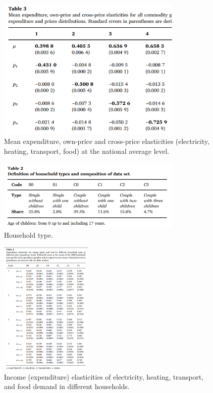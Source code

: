 \begin{figure}[h]  %
	\centering
	\includegraphics[width=0.8\textwidth]{./figure/ch2/fig2.2_table3.png}
	\caption{Mean expenditure, own-price and cross-price elasticities (electricity, heating, transport, food) at the national average level.}\label{fig2.2}
\end{figure}

\begin{figure}[h]  %
	\centering
		\includegraphics[width=0.8\textwidth]{./figure/ch2/fig2.3_table2.png}
	\caption{Household type.}\label{fig2.3}

\end{figure}

\begin{figure}[h]  %
	\centering
	\includegraphics[width=0.4\textwidth]{./figure/ch2/fig2.4_table4.png}
	\caption{Income (expenditure) elasticities of electricity, heating, transport, and food demand in different households.}\label{fig2.4}
\end{figure}

